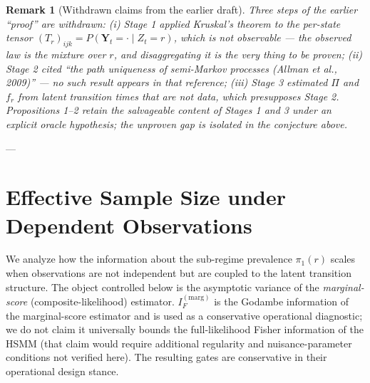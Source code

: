 \documentclass[11pt,a4paper]{article}
\newtheorem{remark}{Remark}
\begin{document}
\begin{remark}[Withdrawn claims from the earlier draft]
Three steps of the earlier ``proof'' are withdrawn: (i) Stage 1 applied Kruskal's theorem to the per-state tensor $(T_r)_{ijk} = P(\mathbf{Y}_t = \cdot \mid Z_t = r)$, which is not observable --- the observed law is the mixture over $r$, and disaggregating it is the very thing to be proven; (ii) Stage 2 cited ``the path uniqueness of semi-Markov processes (Allman et al., 2009)'' --- no such result appears in that reference; (iii) Stage 3 estimated $\Pi$ and $f_r$ from latent transition times that are not data, which presupposes Stage 2. Propositions 1--2 retain the salvageable content of Stages 1 and 3 under an explicit oracle hypothesis; the unproven gap is isolated in the conjecture above. %
\end{remark}

---

\section{Effective Sample Size under Dependent Observations}

We analyze how the information about the sub-regime prevalence $\pi_1(r)$ scales when observations are not independent but are coupled to the latent transition structure. The object controlled below is the asymptotic variance of the \emph{marginal-score} (composite-likelihood) estimator. $I_F^{(\mathrm{marg})}$ is the Godambe information of the marginal-score estimator and is used as a conservative operational diagnostic; we do not claim it universally bounds the full-likelihood Fisher information of the HSMM (that claim would require additional regularity and nuisance-parameter conditions not verified here). The resulting gates are conservative in their operational design stance. %
\end{document}
